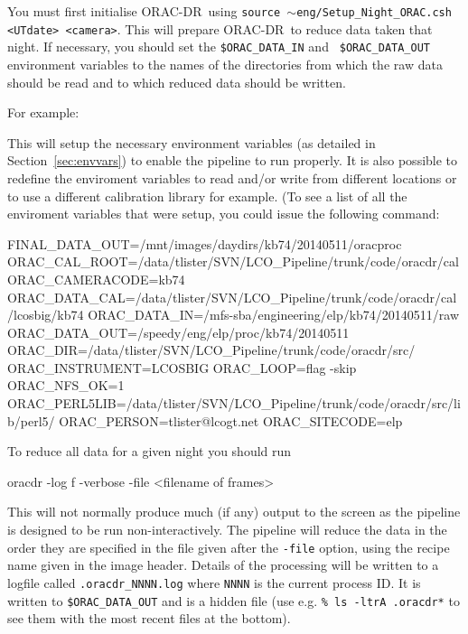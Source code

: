 \documentclass[twoside,11pt,nolof]{starlink}
\providecommand{\ORACDR}{{\footnotesize ORAC-DR}}
\begin{document}
You must first initialise \ORACDR\ using
\texttt{source $\sim$eng/Setup\_Night\_ORAC.csh <UTdate> <camera>}. This will prepare
\ORACDR\ to reduce data taken that night. 
If necessary, you should set the
\texttt{\$ORAC\_DATA\_IN} and \texttt{ \$ORAC\_DATA\_OUT} environment variables
to the names of the directories from which the raw data should be read and to
which reduced data should be written.

For example:

\begin{terminalv}
\end{terminalv}

This will setup the necessary environment variables (as detailed in
Section~\ref{sec:envvars}) to enable the pipeline to run properly. It is
also possible to redefine the enviroment variables to read and/or write from
different locations or to use a different calibration library for example. (To
see a list of all the enviroment variables that were setup, you could issue the
following command:
\begin{terminalv}
      FINAL_DATA_OUT=/mnt/images/daydirs/kb74/20140511/oracproc
      ORAC_CAL_ROOT=/data/tlister/SVN/LCO_Pipeline/trunk/code/oracdr/cal
      ORAC_CAMERACODE=kb74
      ORAC_DATA_CAL=/data/tlister/SVN/LCO_Pipeline/trunk/code/oracdr/cal/lcosbig/kb74
      ORAC_DATA_IN=/mfs-sba/engineering/elp/kb74/20140511/raw
      ORAC_DATA_OUT=/speedy/eng/elp/proc/kb74/20140511
      ORAC_DIR=/data/tlister/SVN/LCO_Pipeline/trunk/code/oracdr/src/
      ORAC_INSTRUMENT=LCOSBIG
      ORAC_LOOP=flag -skip
      ORAC_NFS_OK=1
      ORAC_PERL5LIB=/data/tlister/SVN/LCO_Pipeline/trunk/code/oracdr/src/lib/perl5/
      ORAC_PERSON=tlister@lcogt.net
      ORAC_SITECODE=elp 
\end{terminalv}

To reduce all data for a given night you should run 

\begin{terminalv}
      oracdr -log f -verbose -file <filename of frames>
\end{terminalv}

This will not normally produce much (if any) output to the screen as the
pipeline is designed to be run non-interactively. The pipeline will reduce the
data in the order they are specified in the file given after the \verb+-file+
option, using the recipe name given in the image header. Details of the
processing will be written to a logfile called \texttt{.oracdr\_NNNN.log} where
\texttt{NNNN} is the current process ID. It is written to
\texttt{\$ORAC\_DATA\_OUT} and is a hidden file (use e.g. \verb+% ls -ltrA .oracdr*+ 
to see them with the most recent files at the bottom).
\end{document}
